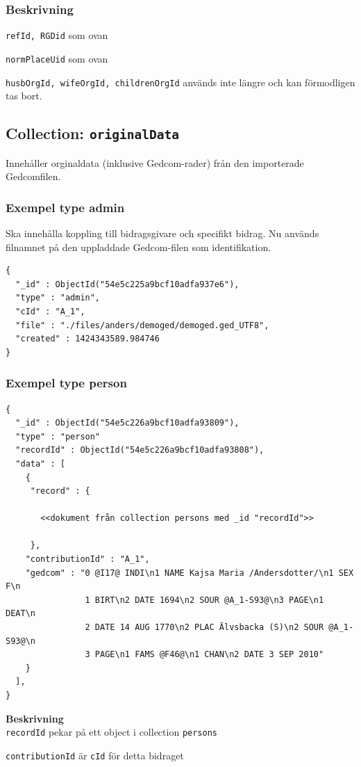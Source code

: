 \documentclass[swedish,11pt]{article}
\begin{document}
\subsubsection{Beskrivning}
\verb+refId, RGDid+ som ovan

\verb+normPlaceUid+ som ovan

\verb+husbOrgId, wifeOrgId, childrenOrgId+ används inte längre och kan
förmodligen tas bort.
 
\subsection{Collection: \tt originalData}
Innehåller orginaldata (inklusive Gedcom-rader) från den importerade
Gedcomfilen.

\subsubsection{Exempel type admin}
Ska innehålla koppling till bidragsgivare och specifikt bidrag. Nu
används filnamnet på den uppladdade Gedcom-filen som identifikation.
\begin{verbatim}
{
  "_id" : ObjectId("54e5c225a9bcf10adfa937e6"),
  "type" : "admin",
  "cId" : "A_1",
  "file" : "./files/anders/demoged/demoged.ged_UTF8",
  "created" : 1424343589.984746
}
\end{verbatim}

\subsubsection{Exempel type person}
\begin{verbatim}
{
  "_id" : ObjectId("54e5c226a9bcf10adfa93809"),
  "type" : "person"
  "recordId" : ObjectId("54e5c226a9bcf10adfa93808"),
  "data" : [
    {
     "record" : {

       <<dokument från collection persons med _id "recordId">>

     },
    "contributionId" : "A_1",
    "gedcom" : "0 @I17@ INDI\n1 NAME Kajsa Maria /Andersdotter/\n1 SEX F\n
                1 BIRT\n2 DATE 1694\n2 SOUR @A_1-S93@\n3 PAGE\n1 DEAT\n
                2 DATE 14 AUG 1770\n2 PLAC Älvsbacka (S)\n2 SOUR @A_1-S93@\n
                3 PAGE\n1 FAMS @F46@\n1 CHAN\n2 DATE 3 SEP 2010"
    }
  ],
}
\end{verbatim}
{\bf Beskrivning}\\
\verb+recordId+ pekar på ett object i collection \verb+persons+

\verb+contributionId+ är \verb+cId+ för detta bidraget
\end{document}

